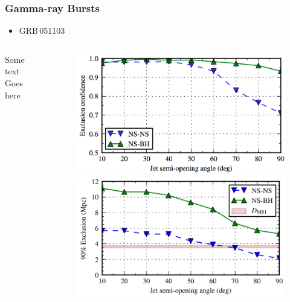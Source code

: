 \documentclass{beamer}
\begin{document}
\begin{frame}
    \frametitle{Gamma-ray Bursts}

    \begin{itemize}
        \item GRB\,051103~\cite{2012arXiv1201.4413T}
    \end{itemize}

    \begin{columns}[]
        \begin{block}{Some text}
            Goes here
        \end{block}

        \begin{center}
        \begin{figure}
            \vspace*{-1.0cm}
            \includegraphics[scale=0.18]{jet_exc_PRODUCTION.png}  \\
            \includegraphics[scale=0.2]{D90_exc_PRODUCTION.png} 
        \end{figure}
        \end{center}
    \end{columns}

\end{frame}
\end{document}
